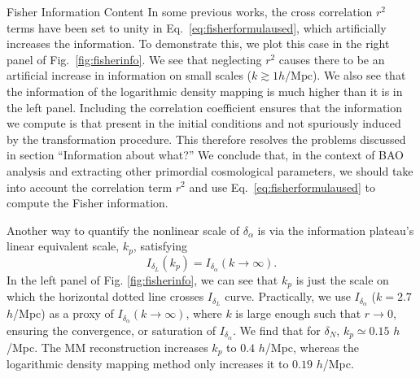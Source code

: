 \begin{section}{Fisher Information Content}
  In some previous works, the cross correlation $r^2$ terms have been set
  to unity in Eq.~\ref{eq:fisherformulaused}, which artificially
  increases the information. To demonstrate this, we plot this case in the right panel of 
  Fig.~\ref{fig:fisherinfo}.  We see that neglecting $r^2$ causes there to be an artificial 
  increase in information on small scales ($k\gtrsim 1h/\mathrm{Mpc}$).  We also see that 
  the information of the logarithmic density
  mapping is much higher than it is in the left panel.  Including the correlation coefficient 
  ensures that the information we compute is that present in the initial conditions and not 
  spuriously induced by the transformation procedure.  This therefore resolves the problems 
  discussed in \cites{bib:HarnoisD2013} \cite{bib:HarnoisD2013} section ``Information about what?''
  We conclude that, in the context of BAO analysis and extracting other primordial cosmological
  parameters, we should take into account the correlation term $r^2$ and
  use Eq.~\ref{eq:fisherformulaused} to compute the Fisher information.
  
  Another way to quantify the nonlinear scale of $\delta_\alpha$
  is via the information plateau's linear equivalent scale, $k_p$, satisfying
  \begin{equation}
      I_{\delta_L}(k_p)=I_{\delta_{\alpha}}(k\rightarrow\infty).
  \end{equation}
  In the left panel of Fig. \ref{fig:fisherinfo}, we can see that 
  $k_p$ is just the scale on which 
  the horizontal dotted line crosses $I_{\delta_{L}}$ curve.
  Practically, we use $I_{\delta_{\alpha}}$ ($k=2.7$ $h$/Mpc)
  as a proxy of $I_{\delta_{\alpha}}(k\rightarrow\infty)$,
  where $k$ is large enough such that $r\rightarrow 0$, ensuring
  the convergence, or saturation of $I_{\delta_{\alpha}}$.
  We find that
  for $\delta_N$, $k_p\simeq 0.15$ $h$/Mpc.
  The MM reconstruction increases $k_p$ to $0.4$ $h$/Mpc,
  whereas the logarithmic density mapping method only increases it to $0.19$ $h$/Mpc.


\end{section}
